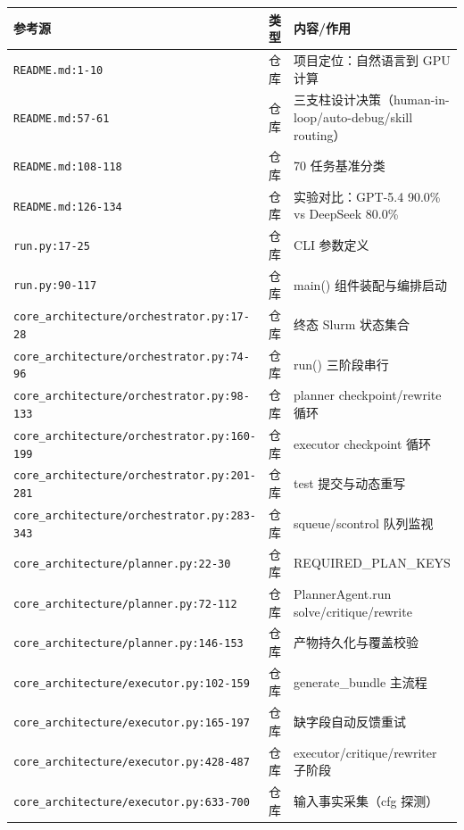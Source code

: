 \documentclass[UTF8]{ctexart}
\begin{document}
\begin{xltabular}{\textwidth}{XlX}
\toprule
\textcolor{evidence}{参考源} & 类型 & 内容/作用 \\
\midrule
\endhead
\texttt{\nolinkurl{README.md:1-10}} & 仓库 & 项目定位：自然语言到 GPU 计算 \\
\texttt{\nolinkurl{README.md:57-61}} & 仓库 & 三支柱设计决策（human-in-loop/auto-debug/skill routing） \\
\texttt{\nolinkurl{README.md:108-118}} & 仓库 & 70 任务基准分类 \\
\texttt{\nolinkurl{README.md:126-134}} & 仓库 & 实验对比：GPT-5.4 90.0\% vs DeepSeek 80.0\% \\
\texttt{\nolinkurl{run.py:17-25}} & 仓库 & CLI 参数定义 \\
\texttt{\nolinkurl{run.py:90-117}} & 仓库 & main() 组件装配与编排启动 \\
\texttt{\nolinkurl{core_architecture/orchestrator.py:17-28}} & 仓库 & 终态 Slurm 状态集合 \\
\texttt{\nolinkurl{core_architecture/orchestrator.py:74-96}} & 仓库 & run() 三阶段串行 \\
\texttt{\nolinkurl{core_architecture/orchestrator.py:98-133}} & 仓库 & planner checkpoint/rewrite 循环 \\
\texttt{\nolinkurl{core_architecture/orchestrator.py:160-199}} & 仓库 & executor checkpoint 循环 \\
\texttt{\nolinkurl{core_architecture/orchestrator.py:201-281}} & 仓库 & test 提交与动态重写 \\
\texttt{\nolinkurl{core_architecture/orchestrator.py:283-343}} & 仓库 & squeue/scontrol 队列监视 \\
\texttt{\nolinkurl{core_architecture/planner.py:22-30}} & 仓库 & REQUIRED\_PLAN\_KEYS \\
\texttt{\nolinkurl{core_architecture/planner.py:72-112}} & 仓库 & PlannerAgent.run solve/critique/rewrite \\
\texttt{\nolinkurl{core_architecture/planner.py:146-153}} & 仓库 & 产物持久化与覆盖校验 \\
\texttt{\nolinkurl{core_architecture/executor.py:102-159}} & 仓库 & generate\_bundle 主流程 \\
\texttt{\nolinkurl{core_architecture/executor.py:165-197}} & 仓库 & 缺字段自动反馈重试 \\
\texttt{\nolinkurl{core_architecture/executor.py:428-487}} & 仓库 & executor/critique/rewriter 子阶段 \\
\texttt{\nolinkurl{core_architecture/executor.py:633-700}} & 仓库 & 输入事实采集（cfg 探测） \\

\end{xltabular}
\end{document}
